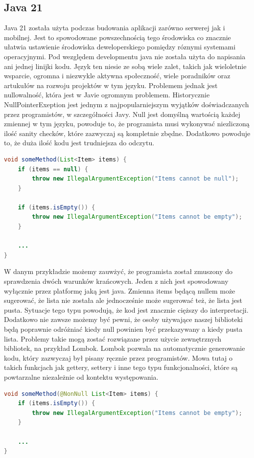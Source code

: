 \subsection{Java 21}\label{subsec:uzyte-technologie-java}
Java 21 została użyta podczas budowania aplikacji zarówno serwerej jak i mobilnej.
Jest to spowodowane powszechnością tego środowiska co znacznie ułatwia ustawienie środowiska deweloperskiego pomiędzy róznymi systemami operacyjnymi.
Pod wezględem developmentu java nie została użyta do napisania ani jednej linijki kodu.
Język ten niesie ze sobą wiele zalet, takich jak wieloletnie wsparcie, ogromna i niezwykle aktywna społeczność, wiele poradników oraz artukułów na rozwoju projektów w tym języku.
Problemem jednak jest nullowalność, która jest w Javie ogromnym problemem.
Historycznie NullPointerExeption jest jednym z najpopularniejszym wyjątków doświadczanych przez programistów, w szczegółności Javy.
Null jest domyślną wartością każdej zmiennej w tym języku, powoduje to, że programista musi wykonywać niezliczoną ilość sanity checków, które zazwyczaj są kompletnie zbędne.
Dodatkowo powoduje to, że duża ilość kodu jest trudniejsza do odczytu.
\begin{lstlisting}[caption=Przykład obsługi null (Java), language=java]
void someMethod(List<Item> items) {
    if (items == null) {
        throw new IllegalArgumentException("Items cannot be null");
    }

    if (items.isEmpty()) {
        throw new IllegalArgumentException("Items cannot be empty");
    }

    ...
}
\end{lstlisting}
W danym przykładzie możemy  zauwżyć, że programista został zmuszony do sprawdzenia dwóch warunków krańcowych.
Jeden z nich jest spowodowany wyłącznie przez platformę jaką jest java.
Zmienna items będącą nullem może sugerować, że lista nie została ale jednocześnie może sugerować też, że lista jest pusta.
Sytuacje tego typu powodują, że kod jest znacznie cięższy do interpretacji.
Dodatkowo nie zawsze możemy być pewni, że osoby używające naszej biblioteki będą poprawnie odróżniać kiedy null powinien być przekazywany a kiedy pusta lista.
Problemy takie mogą zostać rozwiązane przez użycie zewnętrznych bibliotek, na przykład Lombok.
Lombok pozwala na automatycznie generowanie kodu, który zazwyczaj był pisany ręcznie przez programistów.
Mowa tutaj o takich funkcjach jak gettery, settery i inne tego typu funkcjonalności, które są powtarzalne niezależnie od kontektu występowania.
\begin{lstlisting}[caption=Przykład obsługi null (Java z Lombok), language=java]
void someMethod(@NonNull List<Item> items) {
    if (items.isEmpty()) {
        throw new IllegalArgumentException("Items cannot be empty");
    }

    ...
}
\end{lstlisting}
